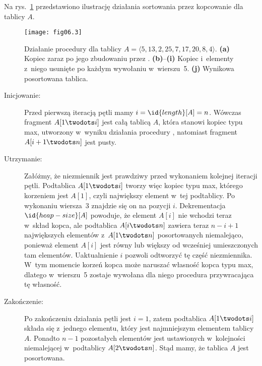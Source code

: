 
\exercise %
Na rys.~\ref{fig:6.4-1} przedstawiono ilustrację działania sortowania przez kopcowanie dla tablicy $A$.
\begin{figure}[ht]
	\begin{center}
		\texttt{[image: fig06.3]}
	\end{center}
	\caption{Działanie procedury  dla tablicy $A=\langle5,13,2,25,7,17,20,8,4\rangle$. {\sffamily\bfseries(a)} Kopiec zaraz po jego zbudowaniu przez . {\sffamily\bfseries(b)}--{\sffamily\bfseries(i)} Kopiec i~elementy z~niego usunięte po każdym wywołaniu  w~wierszu~5. {\sffamily\bfseries(j)} Wynikowa posortowana tablica.} \label{fig:6.4-1}
\end{figure}

\exercise %
\begin{description}
	\item[Inicjowanie:] Przed pierwszą iteracją pętli mamy $i=\id{length}[A]=n$. Wówczas fragment $A[1\twodots i]$ jest całą tablicą $A$, która stanowi kopiec typu max, utworzony w~wyniku działania procedury , natomiast fragment $A[i+1\twodots n]$ jest pusty.
	\item[Utrzymanie:] Załóżmy, że niezmiennik jest prawdziwy przed wykonaniem kolejnej iteracji pętli. Podtablica $A[1\twodots i]$ tworzy więc kopiec typu max, którego korzeniem jest $A[1]$, czyli największy element w~tej podtablicy. Po wykonaniu wiersza~3 znajdzie się on na pozycji $i$. Dekrementacja $\id{heap-size}[A]$ powoduje, że element $A[i]$ nie wchodzi teraz w~skład kopca, ale podtablica $A[i\twodots n]$ zawiera teraz $n-i+1$ największych elementów z~$A[1\twodots n]$ posortowanych niemalejąco, ponieważ element $A[i]$ jest równy lub większy od wcześniej umieszczonych tam elementów. Uaktualnienie $i$ pozwoli odtworzyć tę część niezmiennika. W~tym momencie korzeń kopca może naruszać własność kopca typu max, dlatego w~wierszu~5 zostaje wywołana dla niego procedura  przywracająca tę własność.
	\item[Zakończenie:] Po zakończeniu działania pętli jest $i=1$, zatem podtablica $A[1\twodots i]$ składa się z~jednego elementu, który jest najmniejszym elementem tablicy $A$. Ponadto $n-1$ pozostałych elementów jest ustawionych w~kolejności niemalejącej w~podtablicy $A[2\twodots n]$. Stąd mamy, że tablica $A$ jest posortowana.
\end{description}


